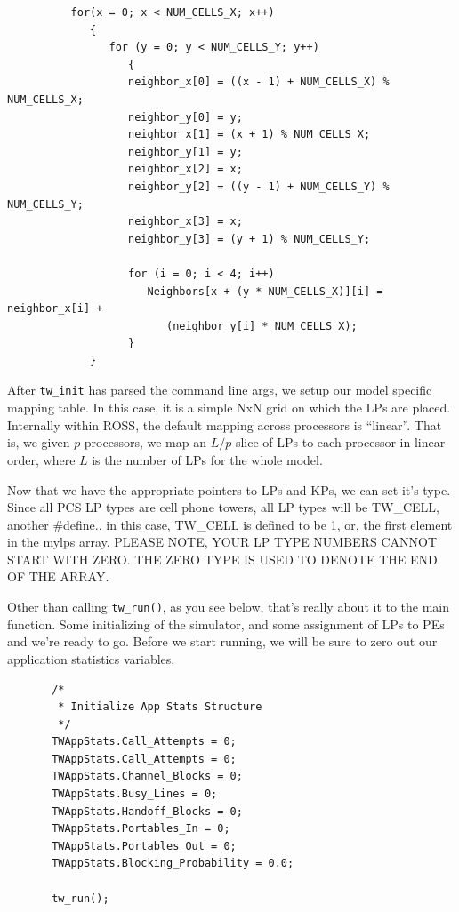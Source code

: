 \documentclass[12pt]{article}
\begin{document}
\begin{verbatim}
          for(x = 0; x < NUM_CELLS_X; x++)
             {
                for (y = 0; y < NUM_CELLS_Y; y++)
                   {
                   neighbor_x[0] = ((x - 1) + NUM_CELLS_X) % NUM_CELLS_X;
                   neighbor_y[0] = y;
                   neighbor_x[1] = (x + 1) % NUM_CELLS_X;
                   neighbor_y[1] = y;
                   neighbor_x[2] = x;
                   neighbor_y[2] = ((y - 1) + NUM_CELLS_Y) % NUM_CELLS_Y;
                   neighbor_x[3] = x;
                   neighbor_y[3] = (y + 1) % NUM_CELLS_Y;

                   for (i = 0; i < 4; i++)
                      Neighbors[x + (y * NUM_CELLS_X)][i] = neighbor_x[i] +
                         (neighbor_y[i] * NUM_CELLS_X);
                   }
             }
\end{verbatim}

After {\tt tw\_init} has parsed the command line args, we setup our model
specific mapping table. In this case, it is a simple NxN grid on which the LPs
are placed. Internally within ROSS, the default mapping across processors is
``linear''. That is, we given $p$ processors, we map an $L/p$ slice of LPs to
each processor in linear order, where $L$ is the number of LPs for the whole
model.

Now that we have the appropriate pointers to LPs and KPs, we can set it's
type.  Since all PCS LP types are cell phone towers, all LP types will be
TW\_CELL, another \#define.. in this case, TW\_CELL is defined to be 1, or,
the first element in the mylps array. PLEASE NOTE, YOUR LP TYPE NUMBERS CANNOT
START WITH ZERO. THE ZERO TYPE IS USED TO DENOTE THE END OF THE ARRAY.

Other than calling {\tt tw\_run()}, as you see below, that's really about it
to the main function.  Some initializing of the simulator, and some assignment
of LPs to PEs and we're ready to go.  Before we start running, we will be sure
to zero out our application statistics variables.

\begin{verbatim}
       /*
        * Initialize App Stats Structure
        */
       TWAppStats.Call_Attempts = 0;
       TWAppStats.Call_Attempts = 0;
       TWAppStats.Channel_Blocks = 0;
       TWAppStats.Busy_Lines = 0;
       TWAppStats.Handoff_Blocks = 0;
       TWAppStats.Portables_In = 0;
       TWAppStats.Portables_Out = 0;
       TWAppStats.Blocking_Probability = 0.0;

       tw_run();
\end{verbatim}
      
\end{document}
